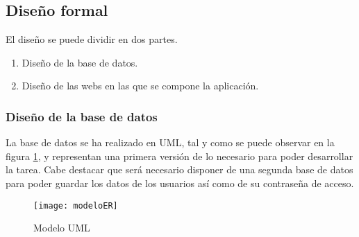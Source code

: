 \documentclass[a4paper]{article}
\begin{document}
	\subsection{Diseño formal}
	El diseño se puede dividir en dos partes.
	\begin{enumerate}
		\item Diseño de la base de datos.
		\item Diseño de las webs en las que se compone la aplicación.
	\end{enumerate}
	
	\subsubsection{Diseño de la base de datos}
	La base de datos se ha realizado en UML, tal y como se puede observar en la figura \ref{modeloER}, y representan una primera versión de lo necesario para poder desarrollar la tarea. Cabe destacar que será necesario disponer de una segunda base de datos para poder guardar los datos de los usuarios así como de su contraseña de acceso.
	\begin{figure}[htb]
		\texttt{[image: modeloER]}
		\caption{Modelo UML}
		\label{modeloER}
	\end{figure}
	
\end{document}
